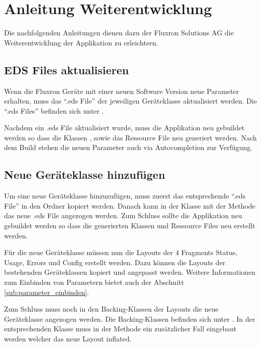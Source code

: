\section{Anleitung Weiterentwicklung}
\label{anleitung_weiterentwicklung}

Die nachfolgenden Anleitungen dienen dazu der Fluxron Solutions AG die Weiterentwicklung der Applikation zu erleichtern.

\subsection{EDS Files aktualisieren}
Wenn die Fluxron Geräte mit einer neuen Software Version neue Parameter erhalten, muss das \enquote{.eds File} der jeweiligen Geräteklasse aktualisiert werden.
Die \enquote{.eds Files} befinden sich unter .

Nachdem ein .eds File aktualisiert wurde, muss die Applikation neu gebuildet werden so dass die Klassen ,  sowie das Ressource File  neu generiert werden. Nach dem Build stehen die neuen Parameter auch via Autocompletion zur Verfügung.

\subsection{Neue Geräteklasse hinzufügen}
Um eine neue Geräteklasse hinzuzufügen, muss zuerst das entsprechende \enquote{.eds File} in den Ordner  kopiert werden. Danach kann in der Klasse  mit der Methode  das neue .eds File angezogen werden. Zum Schluss sollte die Applikation neu gebuildet werden so dass die generierten Klassen und Ressource Files neu erstellt werden.

Für die neue Geräteklasse müssen nun die Layouts der 4 Fragments Status, Usage, Errors und Config erstellt werden. Dazu können die Layouts der bestehenden Geräteklassen kopiert und angepasst werden. Weitere Informationen zum Einbinden von Parametern bietet auch der Abschnitt \ref{sub:parameter_einbinden}.

Zum Schluss muss noch in den Backing-Klassen der Layouts die neue Geräteklasse angezogen werden. Die Backing-Klassen befinden sich unter  . In der entsprechenden Klasse muss in der Methode  ein zusätzlicher Fall eingebaut werden welcher das neue Layout inflated.

